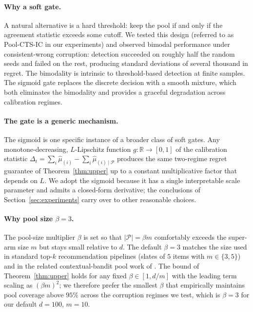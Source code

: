 \documentclass{article}
\theoremstyle{plain}
\theoremstyle{definition}
\theoremstyle{remark}
\newcommand{\R}{\mathbb{R}}
\newcommand{\Pool}{\mathcal{P}}
\begin{document}
\paragraph{Why a soft gate.} A natural alternative is a hard threshold: keep the pool if and only if the agreement statistic exceeds some cutoff. We tested this design (referred to as Pool-CTS-IC in our experiments) and observed bimodal performance under consistent-wrong corruption: detection succeeded on roughly half the random seeds and failed on the rest, producing standard deviations of several thousand in regret. The bimodality is intrinsic to threshold-based detection at finite samples. The sigmoid gate replaces the discrete decision with a smooth mixture, which both eliminates the bimodality and provides a graceful degradation across calibration regimes.

\paragraph{The gate is a generic mechanism.} The sigmoid is one specific instance of a broader class of soft gates. Any monotone-decreasing, $L$-Lipschitz function $g: \R \to [0,1]$ of the calibration statistic $\Delta_t = \sum_i \hat{\mu}_{(i)} - \sum_i \hat{\mu}_{(i) \mid \Pool}$ produces the same two-regime regret guarantee of Theorem~\ref{thm:upper} up to a constant multiplicative factor that depends on $L$. We adopt the sigmoid because it has a single interpretable scale parameter and admits a closed-form derivative; the conclusions of Section~\ref{sec:experiments} carry over to other reasonable choices.

\paragraph{Why pool size $\beta = 3$.} The pool-size multiplier $\beta$ is set so that $|\Pool| = \beta m$ comfortably exceeds the super-arm size $m$ but stays small relative to $d$. The default $\beta = 3$ matches the size used in standard top-$k$ recommendation pipelines (slates of $5$ items with $m \in \{3, 5\}$) and in the related contextual-bandit pool work of \citet{calibgated2025}. The bound of Theorem~\ref{thm:upper} holds for any fixed $\beta \in [1, d/m]$ with the leading term scaling as $(\beta m)^2$; we therefore prefer the smallest $\beta$ that empirically maintains pool coverage above $95\%$ across the corruption regimes we test, which is $\beta = 3$ for our default $d = 100$, $m = 10$.
\end{document}
